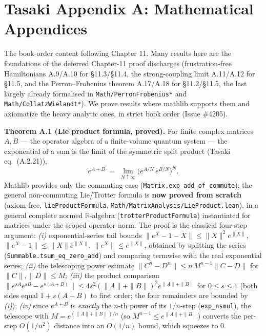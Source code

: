 \documentclass[a4paper,11pt]{article}
\begin{document}
\section{Tasaki Appendix A: Mathematical Appendices}
\label{sec:appendix-a}

The book-order content following Chapter 11.  Many results here are the foundations of the
deferred Chapter-11 proof discharges (frustration-free Hamiltonians A.9/A.10 for §11.3/§11.4,
the strong-coupling limit A.11/A.12 for §11.5, and the Perron--Frobenius theorem A.17/A.18 for
§11.2/§11.5, the last largely already formalised in \texttt{Math/PerronFrobenius*} and
\texttt{Math/CollatzWielandt*}).  We prove results where mathlib supports them and axiomatize
the heavy analytic ones, in strict book order (Issue \#4205).

\medskip\noindent\textbf{Theorem A.1 (Lie product formula, proved).}  For finite complex
matrices $A,B$ --- the operator algebra of a finite-volume quantum system --- the exponential
of a sum is the limit of the symmetric split product (Tasaki eq.~(A.2.21)),
\[
  e^{A+B} \;=\; \lim_{N\uparrow\infty}\bigl(e^{A/N}\,e^{B/N}\bigr)^{N}.
\]
Mathlib provides only the commuting case (\texttt{Matrix.exp\_add\_of\_commute}); the general
non-commuting Lie/Trotter formula is \textbf{now proved from scratch} (axiom-free,
\texttt{lieProductFormula}, \texttt{Math/MatrixAnalysis/LieProduct.lean}), in a general complete
normed $\mathbb R$-algebra (\texttt{trotterProductFormula}) instantiated for matrices under the
scoped operator norm.  The proof is the classical four-step argument: \emph{(i)} exponential-series
tail bounds $\|e^X-1-X\|\le\|X\|^2e^{\|X\|}$, $\|e^X-1\|\le\|X\|e^{\|X\|}$,
$\|e^X\|\le e^{\|X\|}$, obtained by splitting the series
(\texttt{Summable.tsum\_eq\_zero\_add}) and comparing termwise with the real exponential series;
\emph{(ii)} the telescoping power estimate $\|C^n-D^n\|\le n\,M^{n-1}\|C-D\|$ for
$\|C\|,\|D\|\le M$; \emph{(iii)} the product comparison
$\|e^{sA}e^{sB}-e^{s(A+B)}\|\le 4s^2(\|A\|+\|B\|)^2e^{\|A\|+\|B\|}$ for $0\le s\le1$
(both sides equal $1+s(A+B)$ to first order; the four remainders are bounded by \emph{(i)});
\emph{(iv)} since $e^{A+B}$ is \emph{exactly} the $n$-th power of its $1/n$-step
(\texttt{exp\_nsmul}), the telescope with $M=e^{(\|A\|+\|B\|)/n}$ (so
$M^{n-1}\le e^{\|A\|+\|B\|}$) converts the per-step $O(1/n^2)$ distance into an $O(1/n)$ bound,
which squeezes to $0$.
\end{document}
